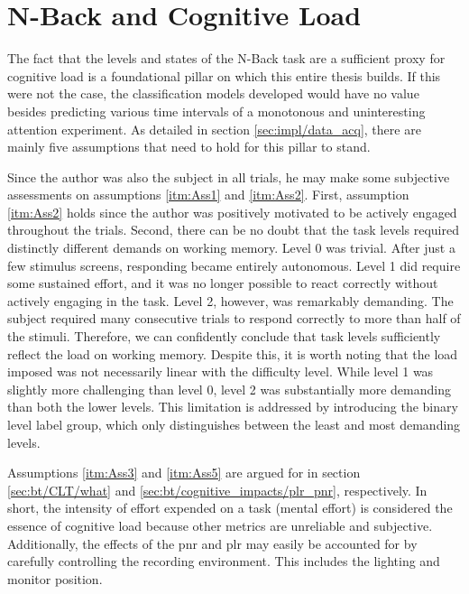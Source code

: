 \section{N-Back and Cognitive Load}

The fact that the levels and states of the N-Back task are a sufficient proxy for cognitive load is a foundational pillar on which this entire thesis builds. If this were not the case, the classification models developed would have no value besides predicting various time intervals of a monotonous and uninteresting attention experiment. As detailed in section \ref{sec:impl/data_acq}, there are mainly five assumptions that need to hold for this pillar to stand. 

Since the author was also the subject in all trials, he may make some subjective assessments on assumptions \ref{itm:Ass1} and \ref{itm:Ass2}. First, assumption \ref{itm:Ass2} holds since the author was positively motivated to be actively engaged throughout the trials. Second, there can be no doubt that the task levels required distinctly different demands on working memory. Level 0 was trivial. After just a few stimulus screens, responding became entirely autonomous. Level 1 did require some sustained effort, and it was no longer possible to react correctly without actively engaging in the task. Level 2, however, was remarkably demanding. The subject required many consecutive trials to respond correctly to more than half of the stimuli. Therefore, we can confidently conclude that task levels sufficiently reflect the load on working memory. Despite this, it is worth noting that the load imposed was not necessarily linear with the difficulty level. While level 1 was slightly more challenging than level 0, level 2 was substantially more demanding than both the lower levels. This limitation is addressed by introducing the binary level label group, which only distinguishes between the least and most demanding levels. %

Assumptions \ref{itm:Ass3} and \ref{itm:Ass5} are argued for in section \ref{sec:bt/CLT/what} and \ref{sec:bt/cognitive_impacts/plr_pnr}, respectively. In short, the intensity of effort expended on a task (mental effort) is considered the essence of cognitive load \cite{hamilton1979} because other metrics are unreliable and subjective. Additionally, the effects of the \acrshort{pnr} and \acrshort{plr} may easily be accounted for by carefully controlling the recording environment. This includes the lighting and monitor position.


